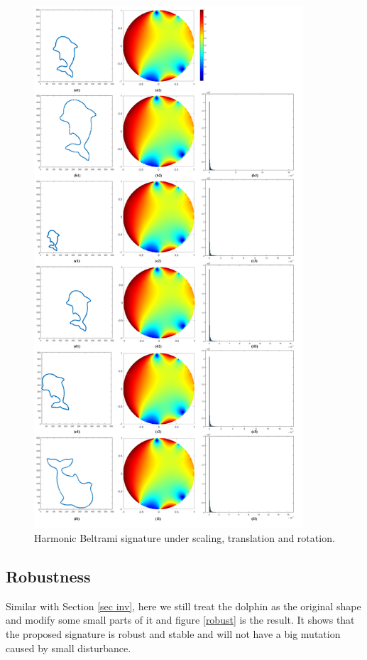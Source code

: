 \documentclass[review,onefignum,onetabnum]{siamonline190516}
\begin{document}
        \begin{figure}
            \begin{center}
                \includegraphics[width=10cm]{inv.png}
            \end{center}
            \caption{Harmonic Beltrami signature under scaling, translation and rotation.}
            \label{inv}
        \end{figure}

    \subsection{Robustness}
        Similar with Section \ref{sec inv}, here we still treat the dolphin as the original shape and modify some small parts of it and figure \ref{robust} is the result. It shows that the proposed signature is robust and stable and will not have a big mutation caused by small disturbance.
\end{document}
